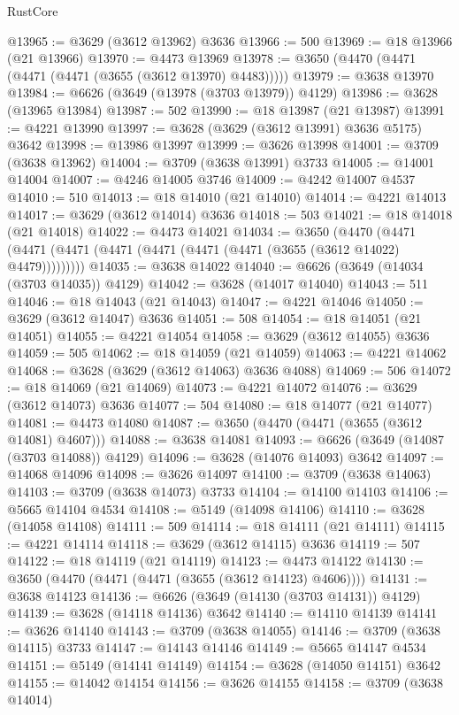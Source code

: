 \begin{lexlean}{RustCore}
\begin{coremodule}
@13965 := @3629 (@3612 @13962) @3636
@13966 := 500
@13969 := @18 @13966 (@21 @13966)
@13970 := @4473 @13969
@13978 := @3650 (@4470 (@4471 (@4471 (@4471 (@3655 (@3612 @13970) @4483)))))
@13979 := @3638 @13970
@13984 := @6626 (@3649 (@13978 (@3703 @13979)) @4129)
@13986 := @3628 (@13965 @13984)
@13987 := 502
@13990 := @18 @13987 (@21 @13987)
@13991 := @4221 @13990
@13997 := @3628 (@3629 (@3612 @13991) @3636 @5175) @3642
@13998 := @13986 @13997
@13999 := @3626 @13998
@14001 := @3709 (@3638 @13962)
@14004 := @3709 (@3638 @13991) @3733
@14005 := @14001 @14004
@14007 := @4246 @14005 @3746
@14009 := @4242 @14007 @4537
@14010 := 510
@14013 := @18 @14010 (@21 @14010)
@14014 := @4221 @14013
@14017 := @3629 (@3612 @14014) @3636
@14018 := 503
@14021 := @18 @14018 (@21 @14018)
@14022 := @4473 @14021
@14034 := @3650
    (@4470 (@4471 (@4471 (@4471 (@4471 (@4471 (@4471 (@4471 (@3655 (@3612 @14022) @4479)))))))))
@14035 := @3638 @14022
@14040 := @6626 (@3649 (@14034 (@3703 @14035)) @4129)
@14042 := @3628 (@14017 @14040)
@14043 := 511
@14046 := @18 @14043 (@21 @14043)
@14047 := @4221 @14046
@14050 := @3629 (@3612 @14047) @3636
@14051 := 508
@14054 := @18 @14051 (@21 @14051)
@14055 := @4221 @14054
@14058 := @3629 (@3612 @14055) @3636
@14059 := 505
@14062 := @18 @14059 (@21 @14059)
@14063 := @4221 @14062
@14068 := @3628 (@3629 (@3612 @14063) @3636 @4088)
@14069 := 506
@14072 := @18 @14069 (@21 @14069)
@14073 := @4221 @14072
@14076 := @3629 (@3612 @14073) @3636
@14077 := 504
@14080 := @18 @14077 (@21 @14077)
@14081 := @4473 @14080
@14087 := @3650 (@4470 (@4471 (@3655 (@3612 @14081) @4607)))
@14088 := @3638 @14081
@14093 := @6626 (@3649 (@14087 (@3703 @14088)) @4129)
@14096 := @3628 (@14076 @14093) @3642
@14097 := @14068 @14096
@14098 := @3626 @14097
@14100 := @3709 (@3638 @14063)
@14103 := @3709 (@3638 @14073) @3733
@14104 := @14100 @14103
@14106 := @5665 @14104 @4534
@14108 := @5149 (@14098 @14106)
@14110 := @3628 (@14058 @14108)
@14111 := 509
@14114 := @18 @14111 (@21 @14111)
@14115 := @4221 @14114
@14118 := @3629 (@3612 @14115) @3636
@14119 := 507
@14122 := @18 @14119 (@21 @14119)
@14123 := @4473 @14122
@14130 := @3650 (@4470 (@4471 (@4471 (@3655 (@3612 @14123) @4606))))
@14131 := @3638 @14123
@14136 := @6626 (@3649 (@14130 (@3703 @14131)) @4129)
@14139 := @3628 (@14118 @14136) @3642
@14140 := @14110 @14139
@14141 := @3626 @14140
@14143 := @3709 (@3638 @14055)
@14146 := @3709 (@3638 @14115) @3733
@14147 := @14143 @14146
@14149 := @5665 @14147 @4534
@14151 := @5149 (@14141 @14149)
@14154 := @3628 (@14050 @14151) @3642
@14155 := @14042 @14154
@14156 := @3626 @14155
@14158 := @3709 (@3638 @14014)

\end{coremodule}
\end{lexlean}

